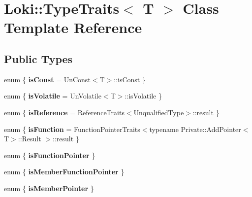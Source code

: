 \hypertarget{classLoki_1_1TypeTraits}{}\section{Loki\+:\+:Type\+Traits$<$ T $>$ Class Template Reference}
\label{classLoki_1_1TypeTraits}
\subsection*{Public Types}
\begin{DoxyCompactItemize}
\item 
\hypertarget{classLoki_1_1TypeTraits_a662c9846ed0942bc181801f0926244b5}{}enum \{ {\bfseries is\+Const} = Un\+Const$<$T$>$\+:\+:is\+Const
 \}\label{classLoki_1_1TypeTraits_a662c9846ed0942bc181801f0926244b5}

\item 
\hypertarget{classLoki_1_1TypeTraits_aa778e88c413af7b508cd4d4217529490}{}enum \{ {\bfseries is\+Volatile} = Un\+Volatile$<$T$>$\+:\+:is\+Volatile
 \}\label{classLoki_1_1TypeTraits_aa778e88c413af7b508cd4d4217529490}

\item 
\hypertarget{classLoki_1_1TypeTraits_a2b95b90f3a26704a686dd22126017baf}{}enum \{ {\bfseries is\+Reference} = Reference\+Traits$<$Unqualified\+Type$>$\+:\+:result
 \}\label{classLoki_1_1TypeTraits_a2b95b90f3a26704a686dd22126017baf}

\item 
\hypertarget{classLoki_1_1TypeTraits_a4bb54f0dedd1a2ce43e240552687f553}{}enum \{ {\bfseries is\+Function} = Function\+Pointer\+Traits$<$typename Private\+:\+:Add\+Pointer$<$T$>$\+:\+:Result $>$\+:\+:result
 \}\label{classLoki_1_1TypeTraits_a4bb54f0dedd1a2ce43e240552687f553}

\item 
\hypertarget{classLoki_1_1TypeTraits_a1d40c8797c42bf5bf2f3378f4dbd3b6b}{}enum \{ {\bfseries is\+Function\+Pointer}
 \}\label{classLoki_1_1TypeTraits_a1d40c8797c42bf5bf2f3378f4dbd3b6b}

\item 
\hypertarget{classLoki_1_1TypeTraits_a3c67d4745a6f5d37467fa7c60649f85a}{}enum \{ {\bfseries is\+Member\+Function\+Pointer}
 \}\label{classLoki_1_1TypeTraits_a3c67d4745a6f5d37467fa7c60649f85a}

\item 
\hypertarget{classLoki_1_1TypeTraits_ab214f27f0c5779266753bf98ee33ac0e}{}enum \{ {\bfseries is\+Member\+Pointer}
 \}\label{classLoki_1_1TypeTraits_ab214f27f0c5779266753bf98ee33ac0e}


\end{DoxyCompactItemize}
